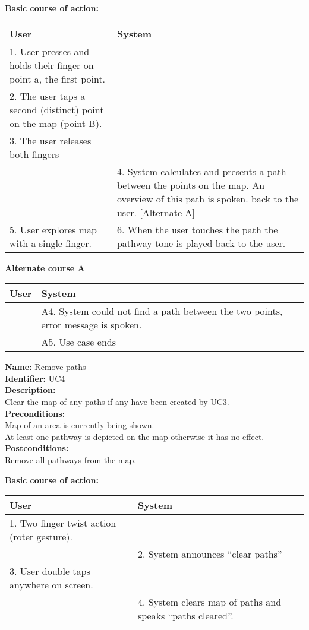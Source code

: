 \documentclass[11pt,twoside,a4paper]{article}
\begin{document}
\textbf{Basic course of action:}\\
\begin{tabularx}{\textwidth}{ |X|X| }
  \textbf{User} & \textbf{System}\\
  \hline
  1. User presses and holds their finger on point a, the first point. &
  \\
  \hline
  2. The user taps a second (distinct) point on the map (point B). & \\
  \hline
  3. The user releases both fingers & \\
  \hline
  & 4. System calculates and presents a path between the points on the
  map. An overview of this path is spoken. back to the user. [Alternate A]\\
  \hline
  5. User explores map with a single finger. & 6. When the user touches
  the path the pathway tone is played back to the user.\\
  \hline
\end{tabularx}

\textbf{Alternate course A}\\
\begin{tabularx}{\textwidth}{ |X|X| }
  \textbf{User} & \textbf{System}\\
  \hline
  & A4. System could not find a path between the two points, error
  message is spoken.\\
  \hline
  & A5. Use case ends\\
  \hline
\end{tabularx}

\textbf{Name:} Remove paths\\
\textbf{Identifier:} UC4\\
\textbf{Description:}\\
Clear the map of any paths if any have been created by UC3.\\
\textbf{Preconditions:}\\
Map of an area is currently being shown.\\
At least one pathway is depicted on the map otherwise it has no
effect.\\
\textbf{Postconditions:}\\
Remove all pathways from the map.

\textbf{Basic course of action:}\\
\begin{tabularx}{\textwidth}{ |X|X| }
  \textbf{User} & \textbf{System}\\
  \hline
  1. Two finger twist action (roter gesture). & \\
  \hline
  & 2. System announces ``clear paths''\\
  \hline
  3. User double taps anywhere on screen. & \\
  \hline
  & 4. System clears map of paths and speaks ``paths cleared''.\\
  \hline
\end{tabularx}
  
\end{document}
